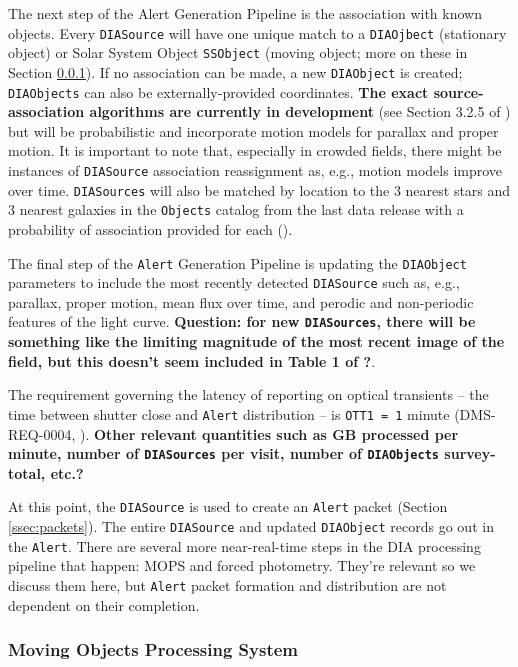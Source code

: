 The next step of the Alert Generation Pipeline is the association with known objects. Every {\tt DIASource} will have one unique match to a {\tt DIAOjbect} (stationary object) or Solar System Object {\tt SSObject} (moving object; more on these in Section \ref{sssec:AGP_MOPS}). If no association can be made, a new {\tt DIAObject} is created; {\tt DIAObjects} can also be externally-provided coordinates. {\bf The exact source-association algorithms are currently in development} (see Section 3.2.5 of ) but will be probabilistic and incorporate motion models for parallax and proper motion. It is important to note that, especially in crowded fields, there might be instances of {\tt DIASource} association reassignment as, e.g., motion models improve over time. {\tt DIASources} will also be matched by location to the 3 nearest stars and 3 nearest galaxies in the {\tt Objects} catalog from the last data release with a probability of association provided for each ().

The final step of the {\tt Alert} Generation Pipeline is updating the {\tt DIAObject} parameters to include the most recently detected {\tt DIASource} such as, e.g.,  parallax, proper motion, mean flux over time, and perodic and non-periodic features of the light curve. {\bf Question: for new {\tt DIASources}, there will be something like the limiting magnitude of the most recent image of the field, but this doesn't seem included in Table 1 of ?}.

The requirement governing the latency of reporting on optical transients -- the time between shutter close and {\tt Alert} distribution -- is {\tt OTT1 = 1} minute (DMS-REQ-0004, ). {\bf Other relevant quantities such as GB processed per minute, number of {\tt DIASources} per visit, number of {\tt DIAObjects} survey-total, etc.?}

At this point, the {\tt DIASource} is used to create an {\tt Alert} packet (Section \ref{ssec:packets}). The entire {\tt DIASource} and updated {\tt DIAObject} records go out in the {\tt Alert}. There are several more near-real-time steps in the DIA processing pipeline that happen: MOPS and forced photometry. They're relevant so we discuss them here, but {\tt Alert} packet formation and distribution are not dependent on their completion.

\subsubsection{Moving Objects Processing System}\label{sssec:AGP_MOPS}

